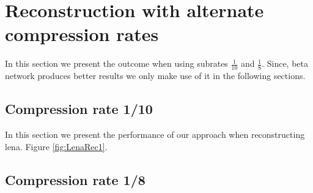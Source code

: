 \section{Reconstruction with alternate compression rates}

In this section we present the outcome when using subrates $\frac{1}{10}$ and $\frac{1}{8}$. Since, beta network produces better results we only make use of it in the following sections. 

\subsection{Compression rate 1/10}

In this section we present the performance of our approach when reconstructing lena. Figure \ref{fig:LenaRec1}.

\subsection{Compression rate 1/8}


